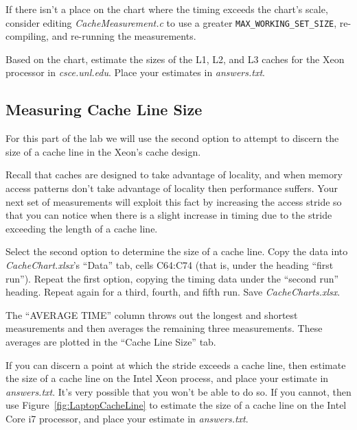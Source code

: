 If there isn't a place on the chart where the timing exceeds the chart's scale,
consider editing \textit{CacheMeasurement.c} to use a greater
\lstinline{MAX_WORKING_SET_SIZE}, re-compiling, and re-running the measurements.

Based on the chart, estimate the sizes of the L1, L2, and L3 caches for the
Xeon processor in \textit{csce.unl.edu}. Place your estimates in
\textit{answers.txt}.

\subsection{Measuring Cache Line Size}

For this part of the lab we will use the second option to attempt to discern the
size of a cache line in the Xeon's cache design.

Recall that caches are designed to take advantage of locality, and when memory
access patterns don't take advantage of locality then performance suffers. Your
next set of measurements will exploit this fact by increasing the access stride
so that you can notice when there is a slight increase in timing due to the
stride exceeding the length of a cache line.

Select the second option to determine the size of a cache line. Copy the data
into \textit{CacheChart.xlsx}'s ``Data'' tab, cells C64:C74 (that is, under the
heading ``first run''). Repeat the first option, copying the timing data under
the ``second run'' heading. Repeat again for a third, fourth, and fifth run.
Save \textit{CacheCharts.xlsx}.

The ``AVERAGE TIME'' column throws out the longest and shortest measurements
and then averages the remaining three measurements. These averages are plotted
in the ``Cache Line Size'' tab.

If you can discern a point at which the stride exceeds a cache line, then
estimate the size of a cache line on the Intel Xeon process, and place your
estimate in \textit{answers.txt}. It's very possible that you won't be able to
do so. If you cannot, then use Figure~\ref{fig:LaptopCacheLine} to estimate the
size of a cache line on the Intel Core i7 processor, and place your estimate in
\textit{answers.txt}.

